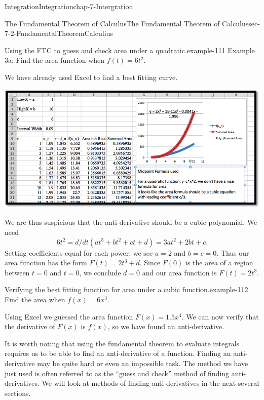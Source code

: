 \documentclass[oneside,10pt,]{book}
\numberwithin{equation}{section}
\begin{document}
\begin{chapterptx}{Integration}{}{Integration}{}{}{chap-7-Intergration}
\begin{sectionptx}{The Fundamental Theorem of Calculus}{}{The Fundamental Theorem of Calculus}{}{}{sec-7-2-FundamentalTheoremCalculius}
\begin{example}{Using the FTC to guess and check area under a quadratic.}{example-111}%
\hypertarget{p-2651}{}%
Example 3a: Find the area function when \(f(t) = 6t^2\).%
\par
\hypertarget{p-2652}{}%
We have already used Excel to find a best fitting curve.%
\begin{sidebyside}{1}{0}{0}{0}%
\begin{sbspanel}{1}%
\includegraphics[width=1\linewidth]{images/sec7-2-10.png}
\end{sbspanel}%
\end{sidebyside}%
\par
\hypertarget{p-2653}{}%
We are thus suspicious that the anti-derivative should be a cubic polynomial.  We need%
%
\begin{equation*}
6t^2=d/dt (at^3+bt^2+ct+d)=3at^2+2bt+c.
\end{equation*}
\hypertarget{p-2654}{}%
Setting coefficients equal for each power, we see \(a = 2\) and \(b = c = 0\).  Thus our area function has the form \(F(t) = 2 t^3 + d\).  Since \(F(0)\) is the area of a region between \(t = 0\) and \(t = 0\), we conclude \(d = 0\) and our area function is \(F(t) = 2 t^3\).%
\end{example}
\begin{example}{Verifying the best fitting function for area under a cubic function.}{example-112}%
\hypertarget{p-2655}{}%
Find the area when \(f(x) = 6 x^3\).%
\par
\hypertarget{p-2656}{}%
Using Excel we guessed the area function \(F(x) = 1.5 x^4\).  We can now verify that the derivative of \(F(x)\) is \(f(x)\), so we have found an anti-derivative.%
\end{example}
\hypertarget{p-2657}{}%
It is worth noting that using the fundamental theorem to evaluate integrals requires us to be able to find an anti-derivative of a function.  Finding an anti-derivative may be quite hard or even an impossible task.  The method we have just used is often referred to as the “guess and check” method of finding anti-derivatives.  We will look at methods of finding anti-derivatives in the next several sections.%

\end{sectionptx}
\end{chapterptx}
\end{document}
